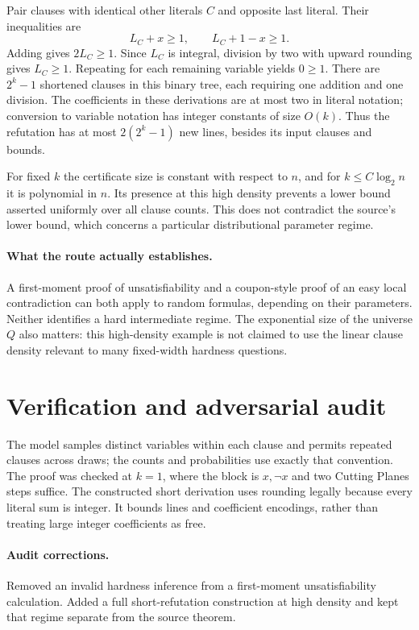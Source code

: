 \documentclass[11pt]{article}
\begin{document}
Pair clauses with identical other literals $C$ and opposite last literal. Their inequalities are
\[
 L_C+x\ge1,\qquad L_C+1-x\ge1.
\]
Adding gives $2L_C\ge1$. Since $L_C$ is integral, division by two with upward rounding gives $L_C\ge1$. Repeating for each remaining variable yields $0\ge1$. There are $2^k-1$ shortened clauses in this binary tree, each requiring one addition and one division. The coefficients in these derivations are at most two in literal notation; conversion to variable notation has integer constants of size $O(k)$. Thus the refutation has at most $2(2^k-1)$ new lines, besides its input clauses and bounds.

For fixed $k$ the certificate size is constant with respect to $n$, and for $k\le C\log_2n$ it is polynomial in $n$. Its presence at this high density prevents a lower bound asserted uniformly over all clause counts. This does not contradict the source's lower bound, which concerns a particular distributional parameter regime.

\paragraph{What the route actually establishes.}
A first-moment proof of unsatisfiability and a coupon-style proof of an easy local contradiction can both apply to random formulas, depending on their parameters. Neither identifies a hard intermediate regime. The exponential size of the universe $Q$ also matters: this high-density example is not claimed to use the linear clause density relevant to many fixed-width hardness questions.
\section{Verification and adversarial audit}
The model samples distinct variables within each clause and permits repeated clauses across draws; the counts and probabilities use exactly that convention. The proof was checked at $k=1$, where the block is $x,\neg x$ and two Cutting Planes steps suffice. The constructed short derivation uses rounding legally because every literal sum is integer. It bounds lines and coefficient encodings, rather than treating large integer coefficients as free.
\paragraph{Audit corrections.} Removed an invalid hardness inference from a first-moment unsatisfiability calculation. Added a full short-refutation construction at high density and kept that regime separate from the source theorem.
\end{document}
